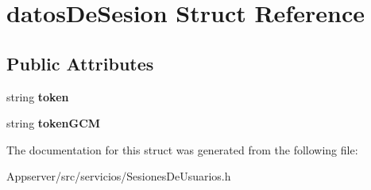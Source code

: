 \hypertarget{structdatosDeSesion}{}\section{datos\+De\+Sesion Struct Reference}
\label{structdatosDeSesion}
\subsection*{Public Attributes}
\begin{DoxyCompactItemize}
\item 
string {\bfseries token}\hypertarget{structdatosDeSesion_a2a9c9ea7693b8cb14914b6fade466f31}{}\label{structdatosDeSesion_a2a9c9ea7693b8cb14914b6fade466f31}

\item 
string {\bfseries token\+G\+CM}\hypertarget{structdatosDeSesion_a4962ca4a68c82f45e7094f3543c1f647}{}\label{structdatosDeSesion_a4962ca4a68c82f45e7094f3543c1f647}

\end{DoxyCompactItemize}


The documentation for this struct was generated from the following file\+:\begin{DoxyCompactItemize}
\item 
Appserver/src/servicios/Sesiones\+De\+Usuarios.\+h\end{DoxyCompactItemize}
